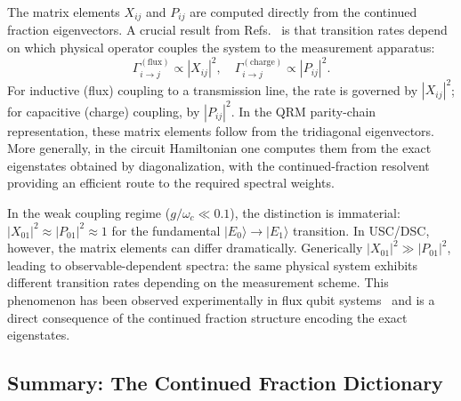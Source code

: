 \documentclass[reprint, floatfix, superscriptaddress, amsmath, amssymb, longbibliography]{revtex4-2}
\begin{document}
The matrix elements $X_{ij}$ and $P_{ij}$ are computed directly from the continued fraction eigenvectors. A crucial result from Refs.~\cite{Kockum2019, Napoli2024} is that transition rates depend on which physical operator couples the system to the measurement apparatus:
\begin{equation}
\Gamma_{i \to j}^{(\mathrm{flux})} \propto |X_{ij}|^2, \quad \Gamma_{i \to j}^{(\mathrm{charge})} \propto |P_{ij}|^2.
\label{eq:dressed_rates}
\end{equation}
For inductive (flux) coupling to a transmission line, the rate is governed by $|X_{ij}|^2$; for capacitive (charge) coupling, by $|P_{ij}|^2$. In the QRM parity-chain representation, these matrix elements follow from the tridiagonal eigenvectors. More generally, in the circuit Hamiltonian one computes them from the exact eigenstates obtained by diagonalization, with the continued-fraction resolvent providing an efficient route to the required spectral weights.

In the weak coupling regime ($g/\omega_c \ll 0.1$), the distinction is immaterial: $|X_{01}|^2 \approx |P_{01}|^2 \approx 1$ for the fundamental $|E_0\rangle \to |E_1\rangle$ transition. In USC/DSC, however, the matrix elements can differ dramatically. Generically $|X_{01}|^2 \gg |P_{01}|^2$, leading to observable-dependent spectra: the same physical system exhibits different transition rates depending on the measurement scheme. This phenomenon has been observed experimentally in flux qubit systems~\cite{FornDiaz2017} and is a direct consequence of the continued fraction structure encoding the exact eigenstates. 


\subsection{Summary: The Continued Fraction Dictionary}
\label{sec:cf_summary}
\end{document}
